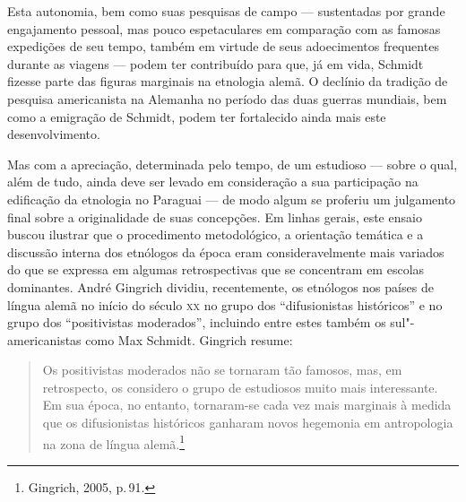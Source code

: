 Esta autonomia, bem como suas pesquisas de campo --- sustentadas por
grande engajamento pessoal, mas pouco espetaculares em comparação com
as famosas expedições de seu tempo, também em virtude de seus
adoecimentos frequentes durante as viagens --- podem ter contribuído para
que, já em vida, Schmidt fizesse parte das figuras marginais na
etnologia alemã. O declínio da tradição de pesquisa americanista na
Alemanha no período das duas guerras mundiais, bem como a emigração de
Schmidt, podem ter fortalecido ainda mais este desenvolvimento.

Mas com a apreciação, determinada pelo tempo, de um estudioso --- sobre o
qual, além de tudo, ainda deve ser levado em consideração a sua
participação na edificação da etnologia no Paraguai --- de modo algum se
proferiu um julgamento final sobre a originalidade de suas concepções.
Em linhas gerais, este ensaio buscou ilustrar que o procedimento
metodológico, a orientação temática e a discussão interna dos etnólogos
da época eram consideravelmente mais variados do que se expressa em
algumas retrospectivas que se concentram em escolas dominantes. André
Gingrich dividiu, recentemente, os etnólogos nos países de língua alemã
no início do século \textsc{xx} no grupo dos ``difusionistas históricos'' e no
grupo dos ``positivistas moderados'', incluindo entre estes também os
sul"-americanistas como Max Schmidt. Gingrich resume: 

\begin{quote}
Os positivistas moderados não se tornaram tão famosos, mas, em retrospecto, os considero o grupo de estudiosos muito mais interessante. Em sua época, no entanto, tornaram-se cada vez mais marginais à medida que os difusionistas históricos ganharam novos hegemonia em antropologia na zona de língua alemã.\footnote{Gingrich, 2005, p.\,91.}
\end{quote}





